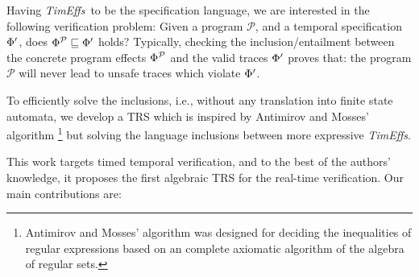 \documentclass[acmsmall,10pt,review]{acmart}
\newcommand{\timedEffects}{\emph{TimEffs}}
\newcommand{\effect}{\textcolor{black}{\ensuremath{\mathrm{\Phi}}}}
\newcommand{\code}[1]{{\tt{\ensuremath{\m{#1}}}}}
\newcommand{\CONTAIN}{\sqsubseteq}
\newcommand{\m}{\mathit}
\begin{document}
 
   






Having \timedEffects\ to be  the specification language, we are interested in the following verification problem: 
Given a program \code{\mathcal{P}},
and a temporal specification \code{\effect^{\prime}}, does 
\code{\effect^{\mathcal{P}} \CONTAIN \effect^{\prime}} holds? Typically, 
checking the inclusion/entailment between the concrete program effects \code{\effect^{\mathcal{P}}} and the valid traces \code{\effect^{\prime}} proves that: the program \code{\mathcal{P}} will never lead to unsafe traces which violate \code{\effect^{\prime}}.

To efficiently solve the inclusions, i.e., without any translation into
finite state automata, we develop a TRS
which  is inspired by Antimirov and Mosses’ algorithm 
\cite{antimirov1995rewriting}\footnote{Antimirov and Mosses' 
algorithm was designed for deciding the inequalities of regular 
expressions based on an 
complete 
axiomatic algorithm of the algebra of regular sets.} but solving the 
language inclusions between more expressive \timedEffects.  

This work targets timed temporal verification, and to the best of 
the authors' knowledge, it proposes the first algebraic TRS 
 for the real-time verification. 
  Our main contributions are:%
\end{document}
